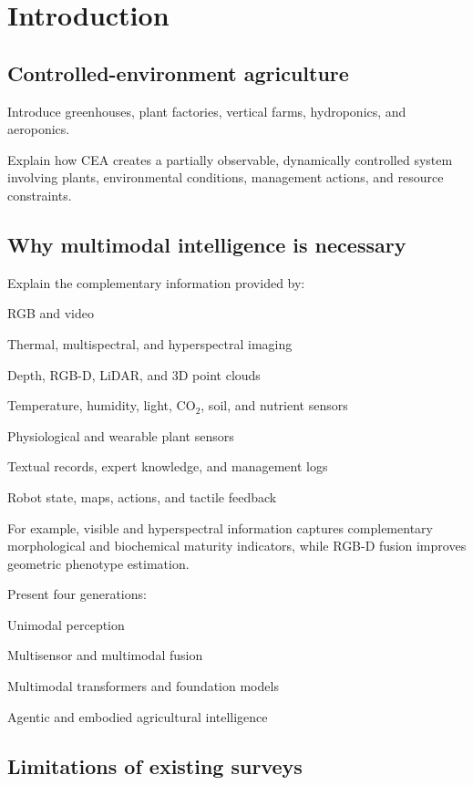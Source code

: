 \documentclass[lettersize,journal]{IEEEtran}
\begin{document}
\section{Introduction}

\subsection{Controlled-environment agriculture}

Introduce greenhouses, plant factories, vertical farms, hydroponics, and aeroponics. 

Explain how CEA creates a partially observable, dynamically controlled system involving plants, environmental conditions, management actions, and resource constraints.

\subsection{Why multimodal intelligence is necessary}

Explain the complementary information provided by:

RGB and video

Thermal, multispectral, and hyperspectral imaging

Depth, RGB-D, LiDAR, and 3D point clouds

Temperature, humidity, light, CO$_2$, soil, and nutrient sensors

Physiological and wearable plant sensors

Textual records, expert knowledge, and management logs

Robot state, maps, actions, and tactile feedback

For example, visible and hyperspectral information captures complementary morphological and biochemical maturity indicators, while RGB-D fusion improves geometric phenotype estimation.

Present four generations:

Unimodal perception

Multisensor and multimodal fusion

Multimodal transformers and foundation models

Agentic and embodied agricultural intelligence


\subsection{Limitations of existing surveys}
\end{document}
